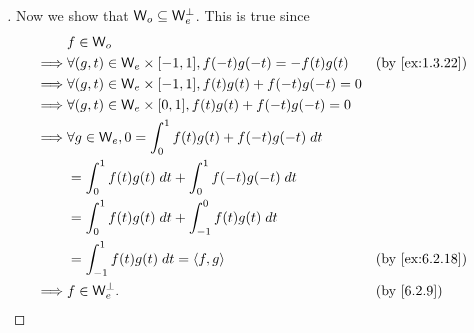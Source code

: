 \begin{proof}[]
  Now we show that \(\mathsf{W}_o \subseteq \mathsf{W}_e^{\perp}\).
  This is true since
  \begin{align*}
             & f \in \W_o                                                                                            \\
    \implies & \forall (g, t) \in \W_e \times [-1, 1], f(-t) g(-t) = -f(t) g(t)    &  & \text{(by \cref{ex:1.3.22})} \\
    \implies & \forall (g, t) \in \W_e \times [-1, 1], f(t) g(t) + f(-t) g(-t) = 0                                   \\
    \implies & \forall (g, t) \in \W_e \times [0, 1], f(t) g(t) + f(-t) g(-t) = 0                                    \\
    \implies & \forall g \in \W_e, 0 = \int_0^1 f(t) g(t) + f(-t) g(-t) \; dt                                        \\
             & = \int_0^1 f(t) g(t) \; dt + \int_0^1 f(-t) g(-t) \; dt                                               \\
             & = \int_0^1 f(t) g(t) \; dt + \int_{-1}^0 f(t) g(t) \; dt                                              \\
             & = \int_{-1}^1 f(t) g(t) \; dt = \inn{f, g}                          &  & \text{(by \cref{ex:6.2.18})} \\
    \implies & f \in \W_e^{\perp}.                                                 &  & \text{(by \cref{6.2.9})}
  \end{align*}


\end{proof}
